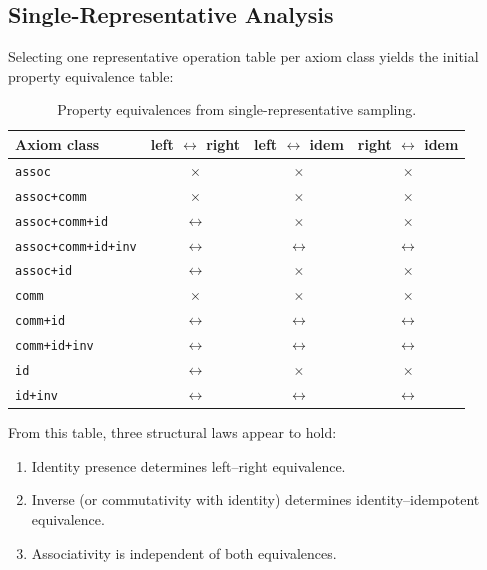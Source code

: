 \subsection{Single-Representative Analysis}

Selecting one representative operation table per axiom class yields the initial property equivalence table:

\begin{table}[h]
\centering
\caption{Property equivalences from single-representative sampling.}
\label{tab:property-single}
\begin{tabular}{lccc}
\toprule
Axiom class & left $\leftrightarrow$ right & left $\leftrightarrow$ idem & right $\leftrightarrow$ idem \\
\midrule
\texttt{assoc}             & $\times$ & $\times$ & $\times$ \\
\texttt{assoc+comm}        & $\times$ & $\times$ & $\times$ \\
\texttt{assoc+comm+id}     & $\leftrightarrow$ & $\times$ & $\times$ \\
\texttt{assoc+comm+id+inv} & $\leftrightarrow$ & $\leftrightarrow$ & $\leftrightarrow$ \\
\texttt{assoc+id}          & $\leftrightarrow$ & $\times$ & $\times$ \\
\texttt{comm}              & $\times$ & $\times$ & $\times$ \\
\texttt{comm+id}           & $\leftrightarrow$ & $\leftrightarrow$ & $\leftrightarrow$ \\
\texttt{comm+id+inv}       & $\leftrightarrow$ & $\leftrightarrow$ & $\leftrightarrow$ \\
\texttt{id}                & $\leftrightarrow$ & $\times$ & $\times$ \\
\texttt{id+inv}            & $\leftrightarrow$ & $\leftrightarrow$ & $\leftrightarrow$ \\
\bottomrule
\end{tabular}
\end{table}

\noindent From this table, three structural laws appear to hold:

\begin{enumerate}
\item Identity presence determines left--right equivalence.
\item Inverse (or commutativity with identity) determines identity--idempotent equivalence.
\item Associativity is independent of both equivalences.
\end{enumerate}


